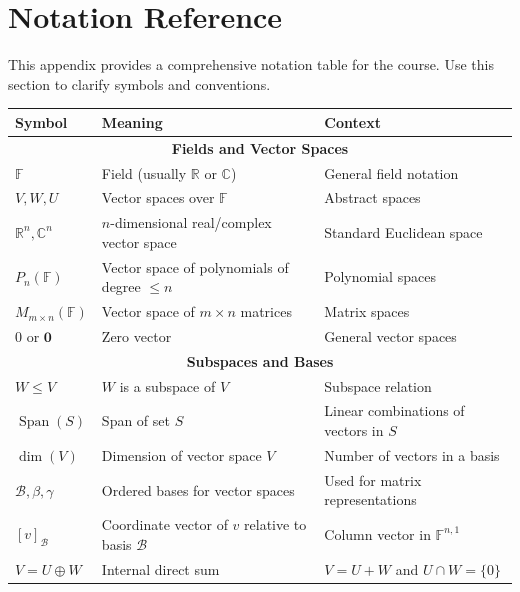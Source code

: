 \newpage
\section{Notation Reference}

This appendix provides a comprehensive notation table for the course. Use this section to clarify symbols and conventions.

\vspace{0.3cm}

\begin{center}
\small
\begin{tabularx}{\textwidth}{|l|X|X|}
\hline
\textbf{Symbol} & \textbf{Meaning} & \textbf{Context} \\
\hline
\multicolumn{3}{|c|}{\textbf{Fields and Vector Spaces}} \\
\hline
$\mathbb{F}$ & Field (usually $\mathbb{R}$ or $\mathbb{C}$) & General field notation \\
$V, W, U$ & Vector spaces over $\mathbb{F}$ & Abstract spaces \\
$\mathbb{R}^n, \mathbb{C}^n$ & $n$-dimensional real/complex vector space & Standard Euclidean space \\
$P_n(\mathbb{F})$ & Vector space of polynomials of degree $\leq n$ & Polynomial spaces \\
$M_{m \times n}(\mathbb{F})$ & Vector space of $m \times n$ matrices & Matrix spaces \\
$0$ or $\mathbf{0}$ & Zero vector & General vector spaces \\
\hline
\multicolumn{3}{|c|}{\textbf{Subspaces and Bases}} \\
\hline
$W \le V$ & $W$ is a subspace of $V$ & Subspace relation \\
$\operatorname{Span}(S)$ & Span of set $S$ & Linear combinations of vectors in $S$ \\
$\dim(V)$ & Dimension of vector space $V$ & Number of vectors in a basis \\
$\mathcal{B}, \beta, \gamma$ & Ordered bases for vector spaces & Used for matrix representations \\
$[v]_{\mathcal{B}}$ & Coordinate vector of $v$ relative to basis $\mathcal{B}$ & Column vector in $\mathbb{F}^{n,1}$ \\
$V = U \oplus W$ & Internal direct sum & $V = U+W$ and $U \cap W = \{0\}$ \\
\hline
\end{tabularx}


\end{center}
